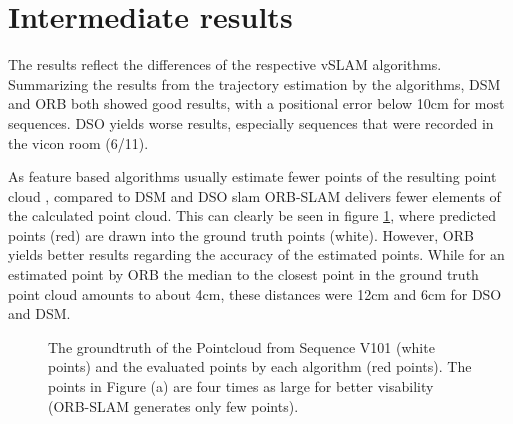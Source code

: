 \documentclass[runningheads]{llncs}
\begin{document}
\section{Intermediate results}

The results reflect the differences of the respective vSLAM algorithms.
Summarizing the results from the trajectory estimation by the algorithms, 
DSM and ORB both showed good results, with a positional error below 10cm 
for most sequences. DSO yields worse results, especially sequences that were
recorded in the vicon room (6/11).


As feature based algorithms usually estimate fewer points of the resulting 
point cloud \cite{point_cloud}, compared to DSM and DSO slam ORB-SLAM delivers fewer elements of the calculated point cloud. This can 
clearly be seen in figure \ref{fig:pointcloud}, where predicted points (red) are drawn into the ground truth points (white). However, 
ORB yields better results regarding the accuracy of the estimated points. While for an estimated point by ORB the median to the closest point in the 
ground truth point cloud amounts to about 4cm, these distances were 12cm and 6cm for DSO and DSM. 


\begin{figure}%
    \centering
    \qquad
	\qquad
    \caption{The groundtruth of the Pointcloud from Sequence V101 (white points) and the evaluated points by each algorithm (red points). 
	The points in Figure (a) are four times as large for better visability (ORB-SLAM generates only few points). 
	}%
    \label{fig:pointcloud}%
\end{figure}
\end{document}

